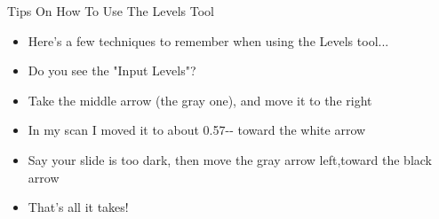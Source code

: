 \documentclass[
]{article}
\begin{document}
Tips On How To Use The Levels Tool

\begin{itemize}
\item
  Here's a few techniques to remember when using the Levels tool...
\item
  Do you see the "Input Levels"?
\item
  Take the middle arrow (the gray one), and move it to the right
\item
  In my scan I moved it to about 0.57-\/- toward the white arrow
\item
  Say your slide is too dark, then move the gray arrow left,toward the
  black arrow
\item
  That's all it takes!
\end{itemize}
\end{document}
